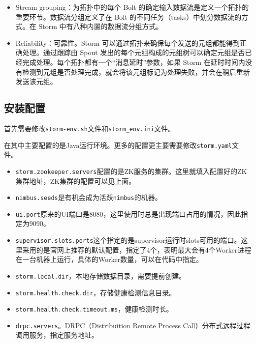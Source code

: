 \begin{itemize}
	\item Stream grouping：为拓扑中的每个 Bolt 的确定输入数据流是定义一个拓扑的重要环节。数据流分组定义了在 Bolt 的不同任务（tasks）中划分数据流的方式。在 Storm 中有八种内置的数据流分组方式。
	\item Reliability：可靠性。Storm 可以通过拓扑来确保每个发送的元组都能得到正确处理。通过跟踪由 Spout 发出的每个元组构成的元组树可以确定元组是否已经完成处理。每个拓扑都有一个“消息延时”参数，如果 Storm 在延时时间内没有检测到元组是否处理完成，就会将该元组标记为处理失败，并会在稍后重新发送该元组。
\end{itemize}

\subsection{安装配置}

首先需要修改\lstinline{storm-env.sh}文件和\lstinline{storm_env.ini}文件。




在其中主要配置的是Java运行环境。更多的配置更主要需要修改\lstinline{storm.yaml}文件。



\begin{itemize}
    \item \lstinline{storm.zookeeper.servers}配置的是ZK服务的集群。这里就填入配置好的ZK集群地址，ZK集群的配置可以见上面。
    \item \lstinline{nimbus.seeds}是有机会成为活跃\lstinline{nimbus}的机器。
    \item \lstinline{ui.port}原来的UI端口是8080，这里使用时总是出现端口占用的情况，因此指定为9090。
    \item \lstinline{supervisor.slots.ports}这个指定的是supervisor运行时slots可用的端口。这里采用的是官网上推荐的默认配置，指定了4个，表明最大会有4个Worker进程在一台机器上运行，具体的Worker数量，可以在代码中指定。
    \item \lstinline{storm.local.dir}，本地存储数据目录，需要提前创建。
    \item \lstinline{storm.health.check.dir}，存储健康检测信息目录。
    \item \lstinline{storm.health.check.timeout.ms}，健康检测时长。
    \item \lstinline{drpc.servers}。DRPC（Distribuition Remote Process Call）分布式远程过程调用服务，指定服务地址。
\end{itemize}

